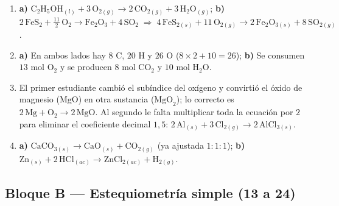 \documentclass[12pt, letterpaper]{article}
\begin{document}
\begin{enumerate}[leftmargin=*, label=\textbf{\arabic*.}, start=1]
  \item \textbf{a)} $\text{C}_2\text{H}_5\text{OH}_{(l)} + 3\,\text{O}_{2(g)} \longrightarrow 2\,\text{CO}_{2(g)} + 3\,\text{H}_2\text{O}_{(g)}$; \quad \textbf{b)} $2\,\text{FeS}_2 + \frac{11}{2}\,\text{O}_2 \longrightarrow \text{Fe}_2\text{O}_3 + 4\,\text{SO}_2 \;\Rightarrow\; 4\,\text{FeS}_{2(s)} + 11\,\text{O}_{2(g)} \longrightarrow 2\,\text{Fe}_2\text{O}_{3(s)} + 8\,\text{SO}_{2(g)}$.
  \item \textbf{a)} En ambos lados hay $8$ C, $20$ H y $26$ O ($8\times 2 + 10 = 26$); \textbf{b)} Se consumen $13\text{ mol O}_2$ y se producen $8\text{ mol CO}_2$ y $10\text{ mol H}_2\text{O}$.
  \item El primer estudiante cambió el subíndice del oxígeno y convirtió el óxido de magnesio ($\text{MgO}$) en otra sustancia ($\text{MgO}_2$); lo correcto es $2\,\text{Mg} + \text{O}_2 \longrightarrow 2\,\text{MgO}$. Al segundo le falta multiplicar toda la ecuación por $2$ para eliminar el coeficiente decimal $1{,}5$: $2\,\text{Al}_{(s)} + 3\,\text{Cl}_{2(g)} \longrightarrow 2\,\text{AlCl}_{3(s)}$.
  \item \textbf{a)} $\text{CaCO}_{3(s)} \longrightarrow \text{CaO}_{(s)} + \text{CO}_{2(g)}$ (ya ajustada $1:1:1$); \quad \textbf{b)} $\text{Zn}_{(s)} + 2\,\text{HCl}_{(ac)} \longrightarrow \text{ZnCl}_{2(ac)} + \text{H}_{2(g)}$.
\end{enumerate}

\subsection*{Bloque B — Estequiometría simple (13 a 24)}
\end{document}
